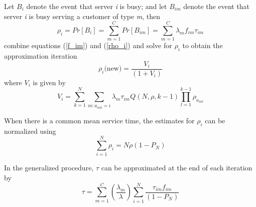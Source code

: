 \begin{frame}
  Let $B_i$ denote the event that server \textit{i} is busy;
  and let $B_{im}$ denote the event that server \textit{i} is busy serving a customer of type \textit{m}, then
  \begin{equation} \label{rho_i}
    \rho_{i} = Pr\left[B_i\right] = \sum_{m=1}^{C}{Pr\left[B_{im}\right]} = \sum_{m=1}^{C}{\lambda_{m}f_{im}\tau_{im}}
  \end{equation}
  combine equations (\ref{f_im}) and (\ref{rho_i}) and solve for $\rho_i$ to obtain the approximation iteration
  \begin{equation}
    \rho_i\mbox{(new)}=\frac{V_i}{(1+V_i)}
  \end{equation}
  where $V_i$ is given by
  \begin{equation} \label{V_i}
    V_i = \sum_{k=1}^{N}{\sum_{m:a_{mk}=i}{\lambda_m \tau_{im} Q(N,\rho,k-1)\prod_{l=1}^{k-1}{\rho_{a_{ml}}}}}
  \end{equation}
\end{frame}

\begin{frame}
  When there is a common mean service time, the estimates for $\rho_i$ can be normalized using
  \begin{equation} \label{P_N}
    \sum_{i=1}^{N}{\rho_i} = N \rho (1 - P_{N})
  \end{equation}

  In the generalized procedure, $\tau$ can be approximated at the end of each iteration by
  \begin{equation} \label{tau}
    \tau = \sum_{m=1}^{C}{\left(\frac{\lambda_m}{\lambda}\right)\sum_{i=1}^{N}{\frac{\tau_{im}f_{im}}{(1-P_N)}}}
  \end{equation}
\end{frame}

